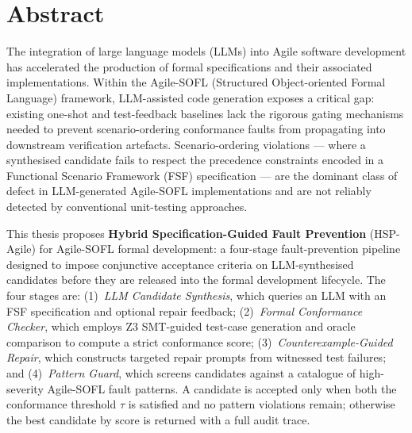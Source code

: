 \chapter*{Abstract}

The integration of large language models (LLMs) into Agile software development has
accelerated the production of formal specifications and their associated implementations.
Within the Agile-SOFL (Structured Object-oriented Formal Language) framework, LLM-assisted
code generation exposes a critical gap: existing one-shot and test-feedback baselines lack
the rigorous gating mechanisms needed to prevent scenario-ordering conformance faults from
propagating into downstream verification artefacts.  Scenario-ordering violations — where
a synthesised candidate fails to respect the precedence constraints encoded in a Functional
Scenario Framework (FSF) specification — are the dominant class of defect in
LLM-generated Agile-SOFL implementations and are not reliably detected by conventional
unit-testing approaches.

This thesis proposes \textbf{Hybrid Specification-Guided Fault Prevention}
(HSP-Agile) for Agile-SOFL formal development: a four-stage fault-prevention pipeline designed to impose conjunctive acceptance criteria
on LLM-synthesised candidates before they are released into the formal development
lifecycle.  The four stages are: (1)~\emph{LLM Candidate Synthesis}, which queries an LLM
with an FSF specification and optional repair feedback; (2)~\emph{Formal Conformance
Checker}, which employs Z3 SMT-guided test-case generation and oracle comparison to
compute a strict conformance score; (3)~\emph{Counterexample-Guided Repair}, which
constructs targeted repair prompts from witnessed test failures; and (4)~\emph{Pattern
Guard}, which screens candidates against a catalogue of high-severity Agile-SOFL fault
patterns.  A candidate is accepted only when both the conformance threshold $\tau$ is
satisfied and no pattern violations remain; otherwise the best candidate by score is
returned with a full audit trace.

